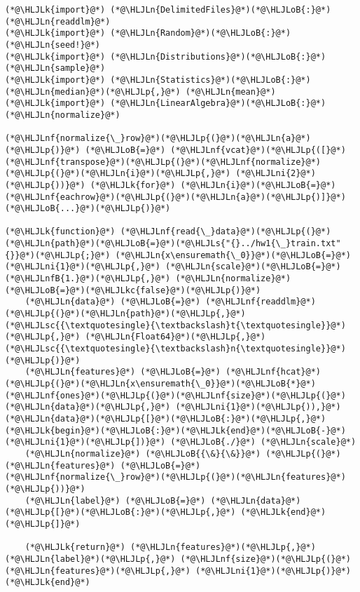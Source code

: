 \documentclass[12pt,a4paper]{article}
\newcommand{\HLJLk}[1]{\textcolor[RGB]{148,91,176}{\textbf{#1}}}
\newcommand{\HLJLkc}[1]{\textcolor[RGB]{59,151,46}{\textit{#1}}}
\newcommand{\HLJLn}[1]{#1}
\newcommand{\HLJLnf}[1]{\textcolor[RGB]{66,102,213}{#1}}
\newcommand{\HLJLs}[1]{\textcolor[RGB]{201,61,57}{#1}}
\newcommand{\HLJLsc}[1]{\textcolor[RGB]{201,61,57}{#1}}
\newcommand{\HLJLnfB}[1]{\textcolor[RGB]{59,151,46}{#1}}
\newcommand{\HLJLni}[1]{\textcolor[RGB]{59,151,46}{#1}}
\newcommand{\HLJLoB}[1]{\textcolor[RGB]{102,102,102}{\textbf{#1}}}
\newcommand{\HLJLp}[1]{#1}
\begin{document}
\begin{lstlisting}
(*@\HLJLk{import}@*) (*@\HLJLn{DelimitedFiles}@*)(*@\HLJLoB{:}@*) (*@\HLJLn{readdlm}@*)
(*@\HLJLk{import}@*) (*@\HLJLn{Random}@*)(*@\HLJLoB{:}@*) (*@\HLJLn{seed!}@*)
(*@\HLJLk{import}@*) (*@\HLJLn{Distributions}@*)(*@\HLJLoB{:}@*) (*@\HLJLn{sample}@*)
(*@\HLJLk{import}@*) (*@\HLJLn{Statistics}@*)(*@\HLJLoB{:}@*) (*@\HLJLn{median}@*)(*@\HLJLp{,}@*) (*@\HLJLn{mean}@*)
(*@\HLJLk{import}@*) (*@\HLJLn{LinearAlgebra}@*)(*@\HLJLoB{:}@*) (*@\HLJLn{normalize}@*)

(*@\HLJLnf{normalize{\_}row}@*)(*@\HLJLp{(}@*)(*@\HLJLn{a}@*)(*@\HLJLp{)}@*) (*@\HLJLoB{=}@*) (*@\HLJLnf{vcat}@*)(*@\HLJLp{([}@*)(*@\HLJLnf{transpose}@*)(*@\HLJLp{(}@*)(*@\HLJLnf{normalize}@*)(*@\HLJLp{(}@*)(*@\HLJLn{i}@*)(*@\HLJLp{,}@*) (*@\HLJLni{2}@*)(*@\HLJLp{))}@*) (*@\HLJLk{for}@*) (*@\HLJLn{i}@*)(*@\HLJLoB{=}@*)(*@\HLJLnf{eachrow}@*)(*@\HLJLp{(}@*)(*@\HLJLn{a}@*)(*@\HLJLp{)]}@*)(*@\HLJLoB{...}@*)(*@\HLJLp{)}@*)

(*@\HLJLk{function}@*) (*@\HLJLnf{read{\_}data}@*)(*@\HLJLp{(}@*)(*@\HLJLn{path}@*)(*@\HLJLoB{=}@*)(*@\HLJLs{"{}../hw1{\_}train.txt"{}}@*)(*@\HLJLp{;}@*) (*@\HLJLn{x\ensuremath{\_0}}@*)(*@\HLJLoB{=}@*)(*@\HLJLni{1}@*)(*@\HLJLp{,}@*) (*@\HLJLn{scale}@*)(*@\HLJLoB{=}@*)(*@\HLJLnfB{1.}@*)(*@\HLJLp{,}@*) (*@\HLJLn{normalize}@*)(*@\HLJLoB{=}@*)(*@\HLJLkc{false}@*)(*@\HLJLp{)}@*)
    (*@\HLJLn{data}@*) (*@\HLJLoB{=}@*) (*@\HLJLnf{readdlm}@*)(*@\HLJLp{(}@*)(*@\HLJLn{path}@*)(*@\HLJLp{,}@*) (*@\HLJLsc{{\textquotesingle}{\textbackslash}t{\textquotesingle}}@*)(*@\HLJLp{,}@*) (*@\HLJLn{Float64}@*)(*@\HLJLp{,}@*) (*@\HLJLsc{{\textquotesingle}{\textbackslash}n{\textquotesingle}}@*)(*@\HLJLp{)}@*)
    (*@\HLJLn{features}@*) (*@\HLJLoB{=}@*) (*@\HLJLnf{hcat}@*)(*@\HLJLp{(}@*)(*@\HLJLn{x\ensuremath{\_0}}@*)(*@\HLJLoB{*}@*)(*@\HLJLnf{ones}@*)(*@\HLJLp{(}@*)(*@\HLJLnf{size}@*)(*@\HLJLp{(}@*)(*@\HLJLn{data}@*)(*@\HLJLp{,}@*) (*@\HLJLni{1}@*)(*@\HLJLp{)),}@*) (*@\HLJLn{data}@*)(*@\HLJLp{[}@*)(*@\HLJLoB{:}@*)(*@\HLJLp{,}@*) (*@\HLJLk{begin}@*)(*@\HLJLoB{:}@*)(*@\HLJLk{end}@*)(*@\HLJLoB{-}@*)(*@\HLJLni{1}@*)(*@\HLJLp{])}@*) (*@\HLJLoB{./}@*) (*@\HLJLn{scale}@*)
    (*@\HLJLn{normalize}@*) (*@\HLJLoB{{\&}{\&}}@*) (*@\HLJLp{(}@*)(*@\HLJLn{features}@*) (*@\HLJLoB{=}@*) (*@\HLJLnf{normalize{\_}row}@*)(*@\HLJLp{(}@*)(*@\HLJLn{features}@*)(*@\HLJLp{))}@*)
    (*@\HLJLn{label}@*) (*@\HLJLoB{=}@*) (*@\HLJLn{data}@*)(*@\HLJLp{[}@*)(*@\HLJLoB{:}@*)(*@\HLJLp{,}@*) (*@\HLJLk{end}@*)(*@\HLJLp{]}@*)
    
    (*@\HLJLk{return}@*) (*@\HLJLn{features}@*)(*@\HLJLp{,}@*) (*@\HLJLn{label}@*)(*@\HLJLp{,}@*) (*@\HLJLnf{size}@*)(*@\HLJLp{(}@*)(*@\HLJLn{features}@*)(*@\HLJLp{,}@*) (*@\HLJLni{1}@*)(*@\HLJLp{)}@*)
(*@\HLJLk{end}@*)


\end{lstlisting}
\end{document}

